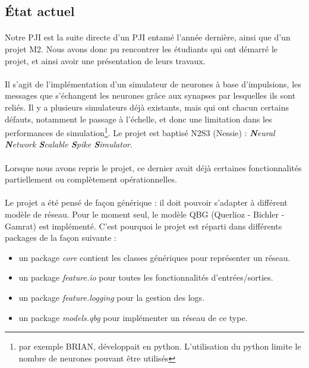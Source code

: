 \documentclass[a4paper,10pt]{article}
\begin{document}
\newpage

\subsection{État actuel}

\paragraph{}
Notre PJI est la suite directe d’un PJI entamé l’année dernière, ainsi que d’un projet M2. Nous avons donc pu rencontrer les étudiants qui ont démarré le projet, et ainsi avoir une présentation de leurs travaux.

\paragraph{}
Il s’agit de l’implémentation d’un simulateur de neurones à base d'impulsions, les messages que s’échangent les neurones grâce aux synapses par lesquelles ils sont reliés. Il y a plusieurs simulateurs déjà existants, mais qui  ont chacun certains défauts, notamment le passage à l’échelle, et donc une limitation dans les performances de simulation\footnote{par exemple BRIAN, développait en python. L'utilisation du python limite le nombre de neurones pouvant être utilisés}. Le projet est baptisé N2S3 (Nessie) : \emph{\textbf{N}eural \textbf{N}etwork \textbf{S}calable
\textbf{S}pike \textbf{S}imulator}.

\paragraph{}
Lorsque nous avons repris le projet, ce dernier avait déjà certaines fonctionnalités partiellement ou complètement opérationnelles.

\paragraph{}
Le projet a été pensé de façon générique : il doit pouvoir s’adapter à différent modèle de réseau. Pour le moment seul, le modèle QBG (Querlioz - Bichler - Gamrat) est implémenté. C’est pourquoi le projet est réparti dans différents packages de la façon suivante :

\begin{itemize}
	\item un package \emph{core} contient les classes génériques pour représenter un réseau.
	\item un package \emph{feature.io} pour toutes les fonctionnalités d’entrées/sorties.
	\item un package \emph{feature.logging} pour la gestion des logs.
	\item un package \emph{models.qbg} pour implémenter un réseau de ce type.
\end{itemize}
\end{document}
